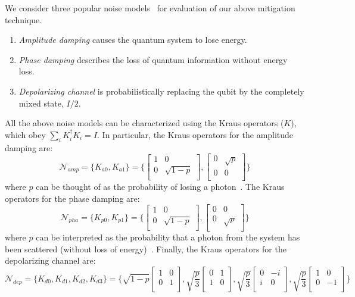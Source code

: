 We consider three popular noise models~\cite{qcqi-book} for evaluation of our above mitigation technique. 
\begin{enumerate}
    \item \emph{Amplitude damping} causes the quantum system to lose energy.
    \item \emph{Phase damping} describes the loss of quantum information without energy loss.
    \item \emph{Depolarizing channel} is probabilistically replacing the qubit by the completely mixed state, $I/2$.
\end{enumerate}
All the above noise models can be characterized using the Kraus operators ($K$), which obey $\sum_{i} K_{i}^{\dagger}K_i=I$. In particular, the Kraus operators for the amplitude damping are:
$$ \mathcal{N}_{amp} = \{K_{a0}, K_{a1}\} = \{ \begin{bmatrix}
  1 & 0 \\
  0 & \sqrt{1 - p} \\
\end{bmatrix}, 
\begin{bmatrix}
  0 & \sqrt{p} \\
  0 & 0 \\
\end{bmatrix} \}$$
where $p$ can be thought of as the probability of losing a photon~\cite{qcqi-book}. 
The Kraus operators for the phase damping are:
$$ \mathcal{N}_{pha} =   \{K_{p0}, K_{p1}\} = \{ \begin{bmatrix}
  1 & 0 \\
  0 & \sqrt{1 - p} \\
\end{bmatrix}, 
\begin{bmatrix}
  0 & 0 \\
  0 & \sqrt{p} \\
\end{bmatrix} \}$$
where $p$ can be interpreted as the probability that a photon from the system has been scattered (without loss of energy)~\cite{qcqi-book}.
Finally, the Kraus operators for the depolarizing channel are:
$$ \mathcal{N}_{dep} = \{K_{d0}, K_{d1}, K_{d2}, K_{d3}\} =  \{\sqrt{1-p}\begin{bmatrix}
  1 & 0 \\
  0 & 1 \\
\end{bmatrix}, \sqrt{\frac{p}{3}}\begin{bmatrix}
  0 & 1 \\
  1 & 0 \\
\end{bmatrix}, \sqrt{\frac{p}{3}}\begin{bmatrix}
  0 & -i \\
  i & 0 \\
\end{bmatrix}, \sqrt{\frac{p}{3}}\begin{bmatrix}
  1 & 0 \\
  0 & -1 \\
\end{bmatrix} \}$$
